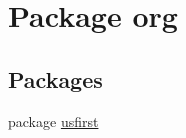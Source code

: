 \hypertarget{namespaceorg}{}\section{Package org}
\label{namespaceorg}
\subsection*{Packages}
\begin{DoxyCompactItemize}
\item 
package \mbox{\hyperlink{namespaceorg_1_1usfirst}{usfirst}}
\end{DoxyCompactItemize}
